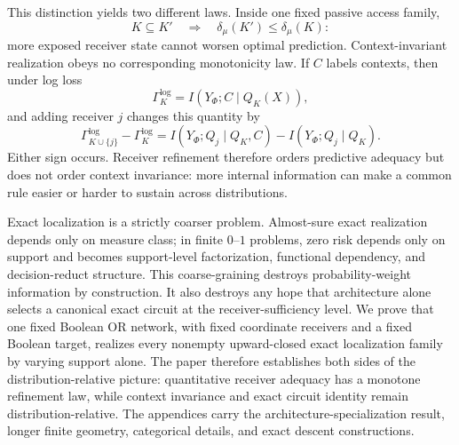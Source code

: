 This distinction yields two different laws. Inside one fixed passive access family,
\[
K\subseteq K'
\quad\Longrightarrow\quad
\delta_\mu(K')\le\delta_\mu(K):
\]
more exposed receiver state cannot worsen optimal prediction. Context-invariant realization obeys no corresponding monotonicity law. If $C$ labels contexts, then under log loss
\[
\Gamma_K^{\log}=I(Y_\Phi;C\mid Q_K(X)),
\]
and adding receiver $j$ changes this quantity by
\begin{equation}
\boxed{
\Gamma_{K\cup\{j\}}^{\log}-\Gamma_K^{\log}
=
I(Y_\Phi;Q_j\mid Q_K,C)
-
I(Y_\Phi;Q_j\mid Q_K).
}
\label{eq:intro-increment}
\end{equation}
Either sign occurs. Receiver refinement therefore orders predictive adequacy but does not order context invariance: more internal information can make a common rule easier or harder to sustain across distributions.

Exact localization is a strictly coarser problem. Almost-sure exact realization depends only on measure class; in finite $0$--$1$ problems, zero risk depends only on support and becomes support-level factorization, functional dependency, and decision-reduct structure. This coarse-graining destroys probability-weight information by construction. It also destroys any hope that architecture alone selects a canonical exact circuit at the receiver-sufficiency level. We prove that one fixed Boolean OR network, with fixed coordinate receivers and a fixed Boolean target, realizes every nonempty upward-closed exact localization family by varying support alone. The paper therefore establishes both sides of the distribution-relative picture: quantitative receiver adequacy has a monotone refinement law, while context invariance and exact circuit identity remain distribution-relative. The appendices carry the architecture-specialization result, longer finite geometry, categorical details, and exact descent constructions.
